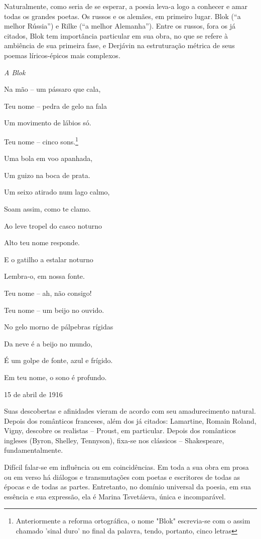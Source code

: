 Naturalmente, como seria de se esperar, a poesia leva-a logo a conhecer
e amar todas os grandes poetas. Os russos e os alemães, em primeiro
lugar. Blok (``a melhor Rússia'') e Rilke (``a melhor Alemanha''). Entre
os russos, fora os já citados, Blok tem importância particular em sua
obra, no que se refere à ambiência de sua primeira fase, e Derjávin na
estruturação métrica de seus poemas líricos-épicos mais complexos.

\emph{A Blok}

Na mão -- um pássaro que cala,

Teu nome -- pedra de gelo na fala

Um movimento de lábios só.

Teu nome -- cinco sons.\footnote{Anteriormente a reforma ortográfica, o
  nome "Blok" escrevia-se com o assim chamado 'sinal duro' no final da
  palavra, tendo, portanto, cinco letras}

Uma bola em voo apanhada,

Um guizo na boca de prata.

Um seixo atirado num lago calmo,

Soam assim, como te clamo.

Ao leve tropel do casco noturno

Alto teu nome responde.

E o gatilho a estalar noturno

Lembra-o, em nossa fonte.

Teu nome -- ah, não consigo!

Teu nome -- um beijo no ouvido.

No gelo morno de pálpebras rígidas

Da neve é a beijo no mundo,

É um golpe de fonte, azul e frígido.

Em teu nome, o sono é profundo.

15 de abril de 1916

Suas descobertas e afinidades vieram de acordo com seu amadurecimento
natural. Depois dos românticos franceses, além dos já citados:
Lamartine, Romain Roland, Vigny, descobre os realistas -- Proust, em
particular. Depois dos românticos ingleses (Byron, Shelley, Tennyson),
fixa-se nos clássicos -- Shakespeare, fundamentalmente.

Difícil falar-se em influência ou em coincidências. Em toda a sua obra
em prosa ou em verso há diálogos e transmutações com poetas e escritores
de todas as épocas e de todas as partes. Entretanto, no domínio
universal da poesia, em sua essência e sua expressão, ela é Marina
Tsvetáieva, única e incomparável.

